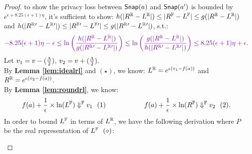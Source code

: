 \documentclass[a4paper,11pt]{article}
\begin{document}
\begin{proof}
%
to show the privacy loss between $\snap(a)$ and $\snap(a')$ is bounded by $e^{\epsilon + 8.25 (\epsilon + 1) \eta}$, it’s sufficient to show:
%
%
$h(|{\rvalR} - {\rvalL}|) \leq |\fvalR - \fvalL| \leq g(|{\rvalR} - {\rvalL}|)$ and 
$h(|{\rvalR{'}} - {\rvalL{'}}|) \leq |\fvalR{'} - \fvalL{'}|
\leq g(|{\rvalR{'}} - {\rvalL{'}}|) $,
%
s.t.:
%
\[
\extend{
	-8.25( \epsilon + 1) \eta - \epsilon
	\leq \ln\left(
	 \frac{h(|{\rvalR} - {\rvalL}|)}{g(|{\rvalR{'}} - {\rvalL{'}}|)} 
	 \right) 
	\leq
	\ln\left( 
	\frac{g(|{\rvalR} - {\rvalL}|)}{h(|{\rvalR{'}} - {\rvalL{'}}|)} 
	\right)
	\leq 8.25( \epsilon + 1) \eta + \epsilon.
	}
\]
		Let $\valv_1 = \valv - (\frac{\Lambda}{2})$,
		$\valv_2 = \valv + (\frac{\Lambda}{2})$.
		\\
		By \textbf{Lemma \ref{lem:idealrl}} and $(\star) $, we know: $\rvalL = e^{\epsilon(\valv_1 - f(a))}$ and 
		$\rvalR = e^{\epsilon(\valv_2 - f(a))}$.
		\\
		By \textbf{Lemma \ref{lem:roundrl}}, we know:
		$$f(a) + \frac{1}{\epsilon} \times \ln(\fvalL) \fbigstep \valv_1 ~~ (1)
		~~~~~~~~~~~~~~~~~
		f(a) + \frac{1}{\epsilon} \times \ln(\fvalR) \fbigstep \valv_2 ~~ (2).$$
	In order to bound $\fvalL$ in terms of $\rvalL$, we have the following derivation where $P$ be the real representation of $\fvalL ~~ (\diamond)$:
{\scriptsize
\begin{mathpar}
\end{mathpar}}
\end{proof}
\end{document}
